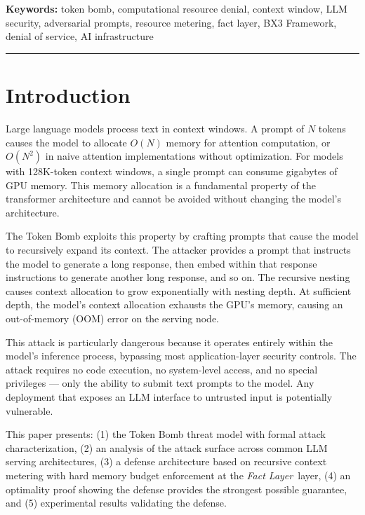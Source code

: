 \documentclass[12pt]{article}
\newcommand{\fact}{\textit{Fact Layer}}
\begin{document}
\vspace{0.5em}
\noindent\textbf{Keywords:} token bomb, computational resource denial, context window, LLM security, adversarial prompts, resource metering, fact layer, BX3 Framework, denial of service, AI infrastructure

\vspace{1em}
\hrule
\vspace{1em}

\onehalfspacing

\section{Introduction}
\label{sec:intro}

Large language models process text in context windows. A prompt of $N$ tokens causes the model to allocate $O(N)$ memory for attention computation, or $O(N^2)$ in naive attention implementations without optimization. For models with 128K-token context windows, a single prompt can consume gigabytes of GPU memory. This memory allocation is a fundamental property of the transformer architecture and cannot be avoided without changing the model's architecture.

The Token Bomb exploits this property by crafting prompts that cause the model to recursively expand its context. The attacker provides a prompt that instructs the model to generate a long response, then embed within that response instructions to generate another long response, and so on. The recursive nesting causes context allocation to grow exponentially with nesting depth. At sufficient depth, the model's context allocation exhausts the GPU's memory, causing an out-of-memory (OOM) error on the serving node.

This attack is particularly dangerous because it operates entirely within the model's inference process, bypassing most application-layer security controls. The attack requires no code execution, no system-level access, and no special privileges — only the ability to submit text prompts to the model. Any deployment that exposes an LLM interface to untrusted input is potentially vulnerable.

This paper presents: (1) the Token Bomb threat model with formal attack characterization, (2) an analysis of the attack surface across common LLM serving architectures, (3) a defense architecture based on recursive context metering with hard memory budget enforcement at the \fact\ layer, (4) an optimality proof showing the defense provides the strongest possible guarantee, and (5) experimental results validating the defense.
\end{document}

